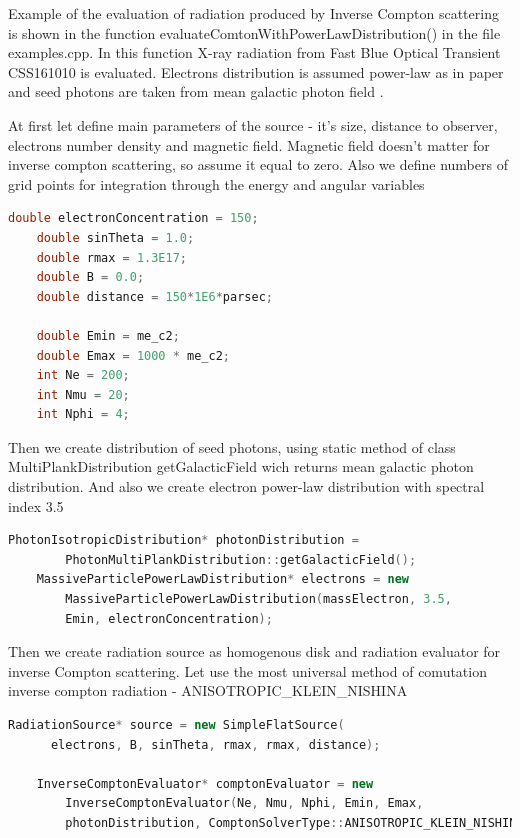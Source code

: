 Example of the evaluation of radiation produced by Inverse Compton scattering is shown in the function  evaluateComtonWithPowerLawDistribution() in the file examples.cpp. In this function X-ray radiation from Fast Blue Optical Transient CSS161010 is evaluated. Electrons distribution is assumed power-law as in paper \cite{Coppejans2020} and seed photons are taken from mean galactic photon field \cite{Mathis1983}.

At first let define main parameters of the source - it's size, distance to observer, electrons number density and magnetic field. Magnetic field doesn't matter for inverse compton scattering, so assume it equal to zero. Also we define numbers of grid points for integration through the energy and angular variables

\begin{lstlisting}[language=c++]
	double electronConcentration = 150;
	double sinTheta = 1.0;
	double rmax = 1.3E17;
	double B = 0.0;
	double distance = 150*1E6*parsec;
	
	double Emin = me_c2;
	double Emax = 1000 * me_c2;
	int Ne = 200;
	int Nmu = 20;
	int Nphi = 4;
\end{lstlisting}

Then we create distribution of seed photons, using static method of class MultiPlankDistribution getGalacticField wich returns mean galactic photon distribution. And also we create electron power-law distribution with spectral index 3.5

\begin{lstlisting}[language=c++]
	PhotonIsotropicDistribution* photonDistribution = 
	    PhotonMultiPlankDistribution::getGalacticField();
	MassiveParticlePowerLawDistribution* electrons = new 
	    MassiveParticlePowerLawDistribution(massElectron, 3.5,
	    Emin, electronConcentration);
\end{lstlisting}

Then we create radiation source as homogenous disk and radiation evaluator for inverse Compton scattering. Let use the most universal method of comutation inverse compton radiation - ANISOTROPIC\_KLEIN\_NISHINA

\begin{lstlisting}[language=c++]
	RadiationSource* source = new SimpleFlatSource(
	  electrons, B, sinTheta, rmax, rmax, distance);
	
	InverseComptonEvaluator* comptonEvaluator = new 
	    InverseComptonEvaluator(Ne, Nmu, Nphi, Emin, Emax, 
	    photonDistribution, ComptonSolverType::ANISOTROPIC_KLEIN_NISHINA);
\end{lstlisting}

